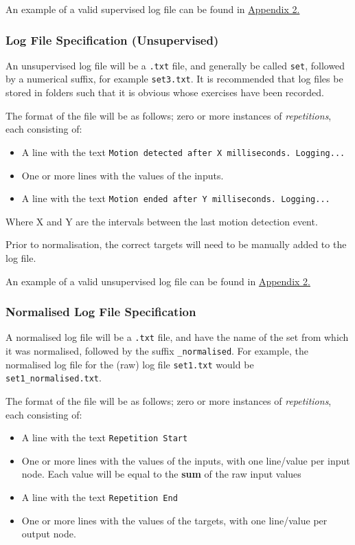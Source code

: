 \documentclass[a4paper]{article}
\begin{document}
An example of a valid supervised log file can be found in \hyperref[subsubsec:a2_lf_supervised]{Appendix 2.}

\subsubsection{Log File Specification (Unsupervised)}

An unsupervised log file will be a \lstinline{.txt} file, and generally be called \lstinline{set}, followed by a numerical suffix, for example \lstinline{set3.txt}. It is recommended that log files be stored in folders such that it is obvious whose exercises have been recorded.

The format of the file will be as follows; zero or more instances of \emph{repetitions}, each consisting of:

\begin{itemize}
\item A line with the text \lstinline{Motion detected after X milliseconds. Logging...}
\item One or more lines with the values of the inputs.
\item A line with the text \lstinline{Motion ended after Y milliseconds. Logging...}
\end{itemize}

Where X and Y are the intervals between the last motion detection event.

Prior to normalisation, the correct targets will need to be manually added to the log file.

An example of a valid unsupervised log file can be found in \hyperref[subsubsec:a2_lf_unsupervised]{Appendix 2.}

\subsubsection{Normalised Log File Specification}

A normalised log file will be a \lstinline{.txt} file, and have the name of the set from which it was normalised, followed by the suffix \lstinline{_normalised}. For example, the normalised log file for the (raw) log file \lstinline{set1.txt} would be \lstinline{set1_normalised.txt}.

The format of the file will be as follows; zero or more instances of \emph{repetitions}, each consisting of:
\begin{itemize}
\item A line with the text \lstinline{Repetition Start}
\item One or more lines with the values of the inputs, with one line/value per input node. Each value will be equal to the \textbf{sum} of the raw input values
\item A line with the text \lstinline{Repetition End}
\item One or more lines with the values of the targets, with one line/value per output node.
\end{itemize}
\end{document}
